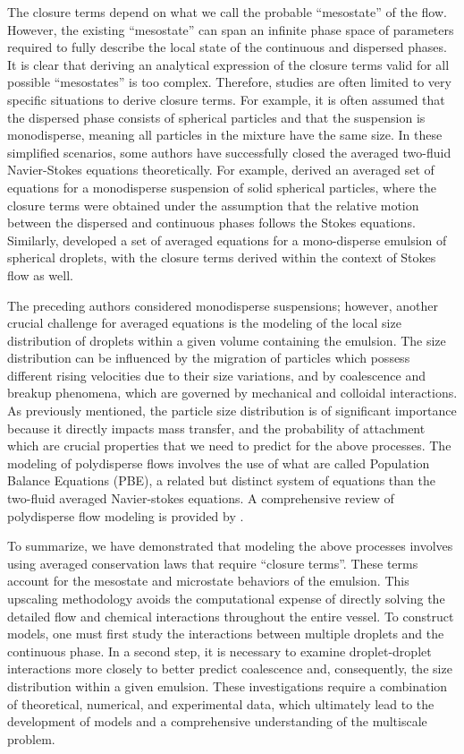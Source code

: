 The closure terms depend on what we call the probable ``mesostate'' of the flow. 
However, the existing ``mesostate'' can span an infinite phase space of parameters required to fully describe the local state of the continuous and dispersed phases.
It is clear that deriving an analytical expression of the closure terms valid for all possible ``mesostates'' is too complex.
Therefore, studies are often limited to very specific situations to derive closure terms.
For example, it is often assumed that the dispersed phase consists of spherical particles and that the suspension is monodisperse, meaning all particles in the mixture have the same size.
In these simplified scenarios, some authors have successfully closed the averaged two-fluid Navier-Stokes equations theoretically.
For example, \citet{jackson1997locally} derived an averaged set of equations for a monodisperse suspension of solid spherical particles, where the closure terms were obtained under the assumption that the relative motion between the dispersed and continuous phases follows the Stokes equations. 
Similarly, \citet{zhang1997momentum} developed a set of averaged equations for a mono-disperse emulsion of spherical droplets, with the closure terms derived within the context of Stokes flow as well.


The preceding authors considered monodisperse suspensions; however, another crucial challenge for averaged equations is the modeling of the local size distribution of droplets within a given volume containing the emulsion.
The size distribution can be influenced by the migration of particles which possess different rising velocities due to their size variations, and by coalescence and breakup phenomena, which are governed by mechanical and colloidal interactions.
As previously mentioned, the particle size distribution is of significant importance because it directly impacts mass transfer, and the probability of attachment which are crucial properties that we need to predict for the above processes.
The modeling of polydisperse flows involves the use of what are called Population Balance Equations (PBE), a related but distinct system of equations than the two-fluid averaged Navier-stokes equations.
A comprehensive review of polydisperse flow modeling is provided by  \citet{marchisio2013computational}. 


To summarize, we have demonstrated that modeling the above processes involves using averaged conservation laws that require ``closure terms''. 
These terms account for the mesostate and microstate behaviors of the emulsion. 
This upscaling methodology avoids the computational expense of directly solving the detailed flow and chemical interactions throughout the entire vessel.
To construct models, one must first study the interactions between multiple droplets and the continuous phase. 
In a second step, it is necessary to examine droplet-droplet interactions more closely to better predict coalescence and, consequently, the size distribution within a given emulsion.
These investigations require a combination of theoretical, numerical, and experimental data, which ultimately lead to the development of models and a comprehensive understanding of the multiscale problem. 

